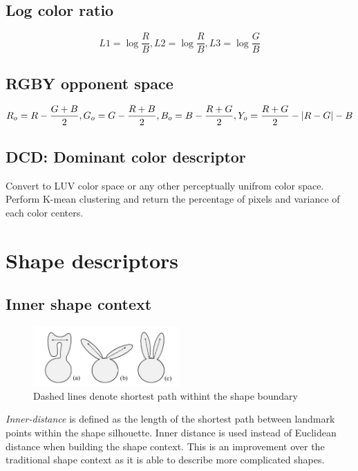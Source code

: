 \documentclass[fypca]{socreport}
\DeclarePairedDelimiter{\abs}{\lvert}{\rvert}
\begin{document}
\subsection{Log color ratio}

\[
  L1 = \log{\frac{R}{B}}, L2 = \log{\frac{R}{B}}, L3 = \log{\frac{G}{B}}
\]

\subsection{RGBY opponent space}

\[
  R_o = R - \frac{G + B}{2}, G_o = G - \frac{R + B}{2}, B_o = B - \frac{R +
    G}{2}, Y_o = \frac{R + G}{2} - \abs{R - G} - B
\]

\subsection{DCD: Dominant color descriptor}

Convert to LUV color space or any other perceptually unifrom color space.
Perform K-mean clustering and return the percentage of pixels and variance of
each color centers.

\section{Shape descriptors}
\label{sec:shape_descriptors}

\subsection{Inner shape context}

\begin{figure}[H]
\centering
  \includegraphics[width=0.5\textwidth, height=0.1\textheight]{innerdistance.png}
  \caption{Dashed lines denote shortest path withint the shape boundary}
  \label{fig:inner_shapecontext}
\end{figure}

\textit{Inner-distance} is defined as the length of the shortest path between
landmark points within the shape silhouette. Inner distance is used instead of
Euclidean distance when building the shape context. This is an improvement over
the traditional shape context as it is able to describe more complicated shapes.
\end{document}
